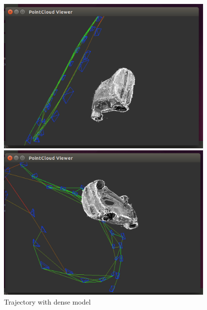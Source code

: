 \documentclass[11pt, oneside]{article}   	%
\begin{document}
\includegraphics[width=0.8\textwidth]{i7}\\
\includegraphics[width=0.8\textwidth]{i8}\\
Trajectory with dense model\\
\end{document}
